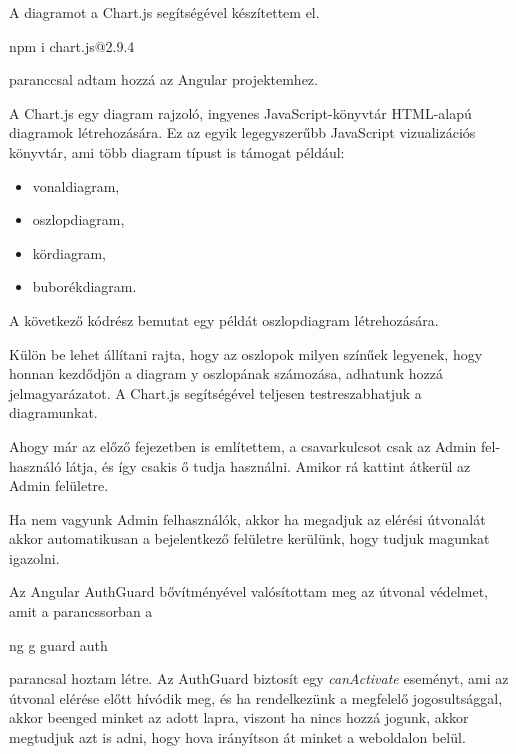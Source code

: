 A diagramot a Chart.js \cite{Chartjs} segítségével készítettem el. 
\begin{java}
npm i chart.js@2.9.4
\end{java}
paranccsal adtam hozzá az Angular projektemhez.

A Chart.js \cite{Chartjs2} egy diagram rajzoló, ingyenes JavaScript-könyvtár HTML-alapú diagramok létrehozására. Ez az egyik legegyszerűbb JavaScript vizualizációs könyvtár, ami több diagram típust is támogat például:

\begin{itemize}
\item vonaldiagram,
\item oszlopdiagram,
\item kördiagram,
\item buborékdiagram.
\end{itemize}

A következő kódrész bemutat egy példát oszlopdiagram létrehozására.

Külön be lehet állítani rajta, hogy az oszlopok milyen színűek legyenek, hogy honnan kezdődjön a diagram y oszlopának számozása, adhatunk hozzá jelmagyarázatot. A Chart.js segítségével teljesen testreszabhatjuk a diagramunkat.

Ahogy már az előző fejezetben is említettem, a csavarkulcsot csak az Admin fel-
használó látja, és így csakis ő tudja használni. Amikor rá kattint átkerül az Admin felületre.

Ha nem vagyunk Admin felhasználók, akkor ha megadjuk az elérési útvonalát akkor automatikusan a bejelentkező felületre kerülünk, hogy tudjuk magunkat igazolni.

Az Angular AuthGuard \cite{Authguard} bővítményével valósítottam meg az útvonal védelmet, amit a parancssorban a 
\begin{java}
ng g guard auth
\end{java}
parancsal hoztam létre.
Az AuthGuard biztosít egy \textit{canActivate} eseményt, ami az útvonal elérése előtt hívódik meg, és ha rendelkezünk a megfelelő jogosultsággal, akkor beenged minket az adott lapra, viszont ha nincs hozzá jogunk, akkor megtudjuk azt is adni, hogy hova irányítson át minket a weboldalon belül.

